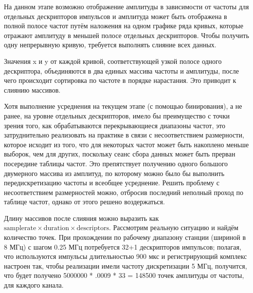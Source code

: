 \documentclass{report}
\begin{document}
На данном этапе возможно отображение амплитуды в зависимости от частоты для отдельных дескрипторов импульсов и амплитуда может быть отображена в полной полосе частот путём наложения на одном графике ряда кривых, которые отражают амплитуду в меньшей полосе отдельных дескрипторов. Чтобы получить одну непрерывную кривую, требуется выполнять слияние всех данных.

Значения x и y от каждой кривой, соответствующей узкой полосе одного дескриптора, объединяются в два единых массива частоты и амплитуды, после чего происходит сортировка по частоте в порядке нарастания. Это приводит к слиянию массивов.

Хотя выполнение усреднения на текущем этапе (с помощью бинирования), а не ранее, на уровне отдельных дескрипторов, имело бы преимущество с точки зрения того, как обрабатываются перекрывающиеся диапазоны частот, это затруднительно реализовать на практике в связи с несоответствием размерности, которое исходит из того, что для некоторых частот может быть накоплено меньше выборок, чем для других, поскольку сеанс сбора данных может быть прерван посередине таблицы частот. Это препятствует получению одного большого двумерного массива из амплитуд, по которому можно было бы выполнить передискретизацию частоты и всеобщее усреднение. Решить проблему с несоответствием размерностей можно, отбросив последний неполный проход по таблице частот, однако от этого решено воздержаться.

Длину массивов после слияния можно выразить как $\text{samplerate} \times \text{duration} \times \text{descriptors}$. Рассмотрим реальную ситуацию и найдём количество точек. При прохождении по рабочему диапазону станции (шириной в 8 МГц) с шагом 0.25 МГц потребуется 32+1 дескрипторов импульсов; полагая, что используются импульсы  длительностью 900 мкс и регистрирующий комплекс настроен так, чтобы реализации имели частоту дискретизации 5 МГц, получится, что будет получено 5000000 * .0009 * 33 = 148500 точек амплитуды от частоты, для каждого канала.
\end{document}
